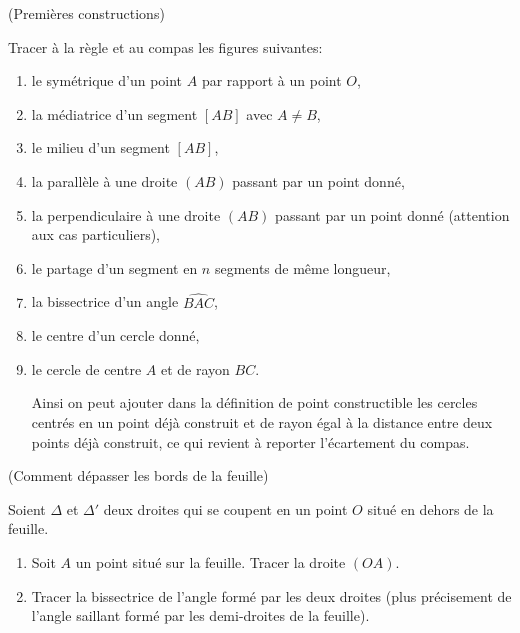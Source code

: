 \documentclass[a4paper,11pt,reqno]{amsart}
\begin{document}
\begin{exo} (Premières constructions)


  Tracer à la règle et au compas les figures suivantes:
  \begin{enumerate}
    \item le symétrique d'un point $A$ par rapport à un point $O$,
    \item la médiatrice d'un segment $[AB]$ avec $A \neq B$,
    \item le milieu d'un segment $[AB]$,
    \item la parallèle à une droite $(AB)$ passant par un point donné,
    \item la perpendiculaire à une droite $(AB)$ passant par un point donné (attention aux cas particuliers),
    \item le partage d'un segment en $n$ segments de même longueur,
    \item la bissectrice d'un angle $\widehat{BAC}$,
    \item le centre d'un cercle donné,
    \item le cercle de centre $A$ et de rayon $BC$.
    \begin{convention}
      Ainsi on peut ajouter dans la définition de point constructible les cercles centrés en un point déjà construit et de rayon égal à la distance entre deux points déjà construit, ce qui revient à reporter l'écartement du compas.
    \end{convention}
  \end{enumerate}
\end{exo}


\begin{exo}  (Comment dépasser les bords de la feuille)

  Soient $\Delta$ et $\Delta'$ deux droites qui se coupent en un point $O$ situé en dehors de la feuille.
  \begin{enumerate}
    \item Soit $A$ un point situé sur la feuille. Tracer la droite $(OA)$.
    \item Tracer la bissectrice de l'angle formé par les deux droites (plus précisement de l'angle saillant formé par les demi-droites de la feuille).
  \end{enumerate}

\end{exo}
\end{document}
